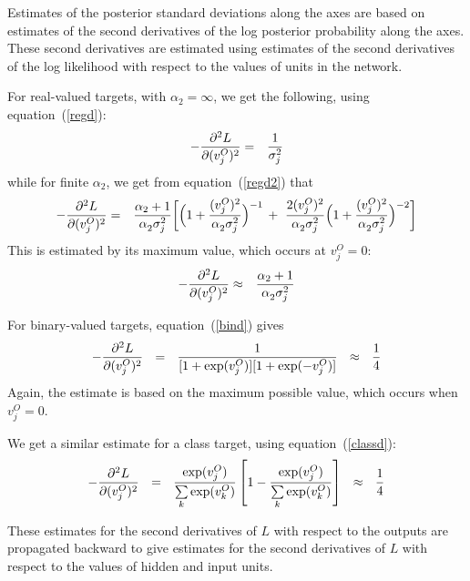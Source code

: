 \documentclass{report}[11pt]
\def\beq{\begin{eqnarray}}
\def\eeq{\end{eqnarray}}
\def\eep{\end{eqnarray}}
\begin{document}
Estimates of the posterior standard deviations along the axes are
based on estimates of the second derivatives of the log posterior
probability along the axes.  These second derivatives are estimated
using estimates of the second derivatives of the log likelihood with
respect to the values of units in the network.

For real-valued targets, with $\alpha_2=\infty$, we get the following,
using equation~(\ref{regd}):\beq
  - {\partial^2 L \over \partial (v^O_j)^2} & = & {1 \over \sigma_j^2}
\eeq%
while for finite $\alpha_2$, we get from equation~(\ref{regd2}) that\beq
  - {\partial^2 L \over \partial (v^O_j)^2} & = &
    {\alpha_2 + 1 \over \alpha_2^{\ } \sigma_j^2} \bigg[
    \Big( 1 + {(v^O_j)^2 \over \alpha_2^{\ }\sigma_j^2} \Big)^{-1}
    \, +\
    {2(v^O_j)^2 \over \alpha_2^{\ }\sigma_j^2} 
    \Big( 1 + {(v^O_j)^2 \over \alpha_2^{\ }\sigma_j^2} \Big)^{-2}
   \bigg]
\eeq%
This is estimated by its maximum value, which occurs at $v^O_j=0$:\beq
  - {\partial^2 L \over \partial (v^O_j)^2} & \approx & 
    {\alpha_2 + 1 \over \alpha_2^{\ } \sigma_j^2} 
\label{maxhest}\eep

For binary-valued targets, equation~(\ref{bind}) gives\beq
  - {\partial^2 L \over \partial (v^O_j)^2} 
     \ \ =\ \ { 1 \over [1+\exp(v^O_j)] [1+\exp(-v^O_j)]}
     \ \ \approx\ \ {1 \over 4}
\eeq%
Again, the estimate is based on the maximum possible value, which occurs
when $v^O_j=0$.

We get a similar estimate for a class target, using equation~(\ref{classd}):\beq
  - {\partial^2 L \over \partial (v^O_j)^2} 
     \ \ =\ \ {\exp(v^O_j) \over \textstyle \sum\limits_k \exp(v^O_k)}
              \left[1 - {\exp(v^O_j) \over \textstyle \sum\limits_k \exp(v^O_k)}
              \right]
     \ \ \approx \ \ {1 \over 4}
\eep

These estimates for the second derivatives of $L$ with respect to the
outputs are propagated backward to give estimates for the second
derivatives of $L$ with respect to the values of hidden and input
units.  
\end{document}
